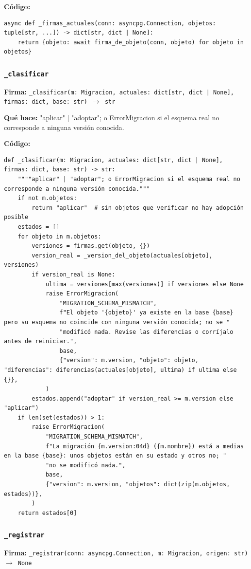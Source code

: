 \documentclass[11pt,a4paper]{article}
\begin{document}
\textbf{Código:}
\begin{lstlisting}
async def _firmas_actuales(conn: asyncpg.Connection, objetos: tuple[str, ...]) -> dict[str, dict | None]:
    return {objeto: await firma_de_objeto(conn, objeto) for objeto in objetos}
\end{lstlisting}

\subsubsection*{\texttt{\_clasificar}}
\textbf{Firma:} \texttt{\_clasificar(m: Migracion, actuales: dict[str, dict | None], firmas: dict, base: str) $\rightarrow$ str}

\textbf{Qué hace:} "aplicar" | "adoptar"; o ErrorMigracion si el esquema real no corresponde a ninguna versión conocida.

\textbf{Código:}
\begin{lstlisting}
def _clasificar(m: Migracion, actuales: dict[str, dict | None], firmas: dict, base: str) -> str:
    """"aplicar" | "adoptar"; o ErrorMigracion si el esquema real no corresponde a ninguna versión conocida."""
    if not m.objetos:
        return "aplicar"  # sin objetos que verificar no hay adopción posible
    estados = []
    for objeto in m.objetos:
        versiones = firmas.get(objeto, {})
        version_real = _version_del_objeto(actuales[objeto], versiones)
        if version_real is None:
            ultima = versiones[max(versiones)] if versiones else None
            raise ErrorMigracion(
                "MIGRATION_SCHEMA_MISMATCH",
                f"El objeto '{objeto}' ya existe en la base {base} pero su esquema no coincide con ninguna versión conocida; no se "
                "modificó nada. Revise las diferencias o corríjalo antes de reiniciar.",
                base,
                {"version": m.version, "objeto": objeto, "diferencias": diferencias(actuales[objeto], ultima) if ultima else {}},
            )
        estados.append("adoptar" if version_real >= m.version else "aplicar")
    if len(set(estados)) > 1:
        raise ErrorMigracion(
            "MIGRATION_SCHEMA_MISMATCH",
            f"La migración {m.version:04d} ({m.nombre}) está a medias en la base {base}: unos objetos están en su estado y otros no; "
            "no se modificó nada.",
            base,
            {"version": m.version, "objetos": dict(zip(m.objetos, estados))},
        )
    return estados[0]
\end{lstlisting}

\subsubsection*{\texttt{\_registrar}}
\textbf{Firma:} \texttt{\_registrar(conn: asyncpg.Connection, m: Migracion, origen: str) $\rightarrow$ None}
\end{document}
